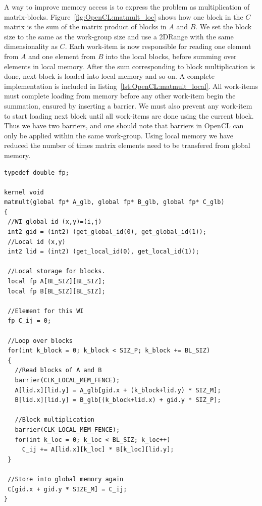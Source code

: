 A way to improve memory access is to express the problem as multiplication of matrix-blocks. 
Figure~\ref{fig:OpenCL:matmult_loc} shows how one block in the $C$ matrix is the sum of the matrix product of blocks in $A$ and $B$. 
We set the block size to the same as the work-group size and use a 2DRange with the same dimensionality as $C$.
Each work-item is now responsible for reading one element from $A$ and one element from $B$ into the local blocks, before summing over elements in local memory.
After the sum corresponding to block multiplication is done, next block is loaded into local memory and so on.
A complete implementation is included in listing~\ref{lst:OpenCL:matmult_local}.
All work-items must complete loading from memory before any other work-item begin the summation, ensured by inserting a barrier.
We must also prevent any work-item to start loading next block until all work-items are done using the current block.
Thus we have two barriers, and one should note that barriers in OpenCL can only be applied within the same work-group.
Using local memory we have reduced the number of times matrix elements need to be transfered from global memory.
\begin{lstlisting}[float,caption={Matrix multiplication in OpenCL using local memory. The matrices $A$, $B$ and $C$ refers to the same matrices as in eq.~\eqref{eq:OpenCL:matmult_def}.},label={lst:OpenCL:matmult_local}]
typedef double fp;

kernel void
matmult(global fp* A_glb, global fp* B_glb, global fp* C_glb)
{
 //WI global id (x,y)=(i,j)
 int2 gid = (int2) (get_global_id(0), get_global_id(1));
 //Local id (x,y)
 int2 lid = (int2) (get_local_id(0), get_local_id(1));

 //Local storage for blocks.    
 local fp A[BL_SIZ][BL_SIZ];
 local fp B[BL_SIZ][BL_SIZ];
    
 //Element for this WI
 fp C_ij = 0;
  
 //Loop over blocks
 for(int k_block = 0; k_block < SIZ_P; k_block += BL_SIZ)
 {
   //Read blocks of A and B
   barrier(CLK_LOCAL_MEM_FENCE);
   A[lid.x][lid.y] = A_glb[gid.x + (k_block+lid.y) * SIZ_M];
   B[lid.x][lid.y] = B_glb[(k_block+lid.x) + gid.y * SIZ_P];
   	
   //Block multiplication
   barrier(CLK_LOCAL_MEM_FENCE);
   for(int k_loc = 0; k_loc < BL_SIZ; k_loc++)
     C_ij += A[lid.x][k_loc] * B[k_loc][lid.y];
 }

 //Store into global memory again
 C[gid.x + gid.y * SIZE_M] = C_ij;
}
\end{lstlisting}
